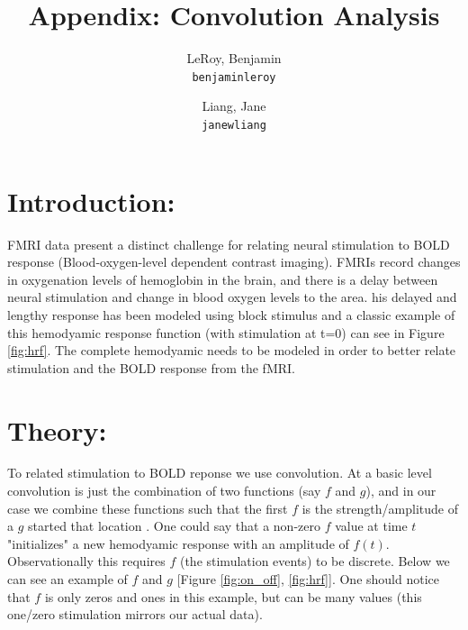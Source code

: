 \documentclass[11pt]{article}
\title{Appendix: Convolution Analysis}
\author{
  LeRoy, Benjamin\\
  \texttt{benjaminleroy}
  \and
  Liang, Jane\\
  \texttt{janewliang}
}
\begin{document}
\maketitle


\section{Introduction:}

FMRI data present a distinct challenge for relating neural stimulation to BOLD response  (Blood-oxygen-level dependent contrast imaging). FMRIs record changes in oxygenation levels of hemoglobin in the brain, and there is a delay between neural stimulation and change in blood oxygen levels to the area. his delayed and lengthy response has been modeled using block stimulus and a classic example of this hemodyamic response function (with stimulation at t=0) can see in Figure \ref{fig:hrf}.  The complete hemodyamic needs to be modeled in order to better relate  stimulation and the BOLD response from the fMRI.

\section{Theory:}

To related stimulation to BOLD reponse we use convolution. At a basic level convolution is just the combination of two functions (say $f$ and $g$), and in our case we combine these functions such that the first $f$ is the strength/amplitude of a $g$ started that location \cite{convolution}. One could say that a non-zero $f$ value at time $t$  "initializes" a new hemodyamic response with an amplitude of $f(t)$.  Observationally this requires $f$ (the stimulation events) to be discrete. Below we can see an example of $f$ and $g$ [Figure \ref{fig:on_off}, \ref{fig:hrf}]. One should notice that $f$ is only zeros and ones in this example, but can be many values (this one/zero stimulation mirrors our actual data).
\end{document}
